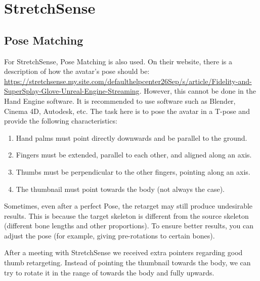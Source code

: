 \documentclass{uva-inf-article}
\begin{document}
\section{StretchSense}\label{section:stretchsense}
\subsection{Pose Matching}
For StretchSense, Pose Matching is also used. On their website, there is a description of how the avatar's pose should be: \url{https://stretchsense.my.site.com/defaulthelpcenter26Sep/s/article/Fidelity-and-SuperSplay-Glove-Unreal-Engine-Streaming}. However, this cannot be done in the Hand Engine software. It is recommended to use software such as Blender, Cinema 4D, Autodesk, etc. The task here is to pose the avatar in a T-pose and provide the following characteristics:
\begin{enumerate}
    \item Hand palms must point directly downwards and be parallel to the ground.
    \item Fingers must be extended, parallel to each other, and aligned along an axis.
    \item Thumbs must be perpendicular to the other fingers, pointing along an axis.
    \item The thumbnail must point towards the body (not always the case).
\end{enumerate}

Sometimes, even after a perfect Pose, the retarget may still produce undesirable results. This is because the target skeleton is different from the source skeleton (different bone lengths and other proportions). To ensure better results, you can adjust the pose (for example, giving pre-rotations to certain bones).

After a meeting with StretchSense we received extra pointers regarding good thumb retargeting. Instead of pointing the thumbnail towards the body, we can try to rotate it in the range of towards the body and fully upwards.
\end{document}
